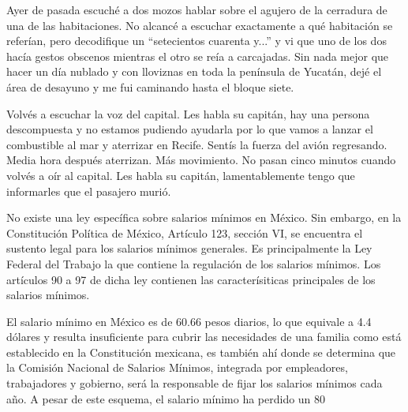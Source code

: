 \documentclass[11pt,twoside,openright,a6paper]{book}
\begin{document}
Ayer de pasada escuché a dos mozos hablar sobre el agujero de la cerradura de
una de las habitaciones. No alcancé a escuchar exactamente a qué habitación
se referían, pero decodifique un “setecientos cuarenta y...” y vi que uno
de los dos hacía gestos obscenos mientras el otro se reía a carcajadas. Sin
nada mejor que hacer un día nublado y con lloviznas en toda la península de
Yucatán, dejé el área de desayuno y me fui caminando hasta el bloque siete.


\vspace{0.5cm}
\hrulefill\hspace{0.2cm} \decofourleft\decofourright \hspace{0.2cm} \hrulefill
\vspace{0.5cm}

Volvés a escuchar la voz del capital. Les habla su capitán, hay una
persona descompuesta y no estamos pudiendo ayudarla por lo que vamos a
lanzar el combustible al mar y aterrizar en Recife. Sentís la fuerza del
avión regresando. Media hora después aterrizan. Más movimiento. No pasan
cinco minutos cuando volvés a oír al capital. Les habla su capitán,
lamentablemente tengo que informarles que el pasajero murió.


\vspace{0.5cm}
\hrulefill\hspace{0.2cm} \decofourleft\decofourright \hspace{0.2cm} \hrulefill
\vspace{0.5cm}

No existe una ley específica sobre salarios mínimos en México. Sin
embargo, en la Constitución Política de México, Artículo 123, sección
VI, se encuentra el sustento legal para los salarios mínimos generales. Es
principalmente  la Ley Federal del Trabajo la que contiene la regulación
de los salarios mínimos. Los artículos 90 a 97 de dicha ley contienen
las caracterísiticas principales de los salarios mínimos.

El salario mínimo en México es de 60.66 pesos diarios, lo que equivale
a 4.4 dólares y resulta insuficiente para cubrir las necesidades de una
familia como está establecido en la Constitución mexicana, es también
ahí donde se determina que la Comisión Nacional de Salarios Mínimos,
integrada por empleadores, trabajadores y gobierno, será la responsable de
fijar los salarios mínimos cada año. A pesar de este esquema, el salario
mínimo ha perdido un 80%
\end{document}
